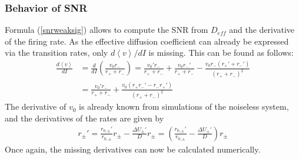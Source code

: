 \documentclass[12pt,a4paper]{article}
\begin{document}
\subsubsection{Behavior of SNR}
Formula (\ref{snrweaksig}) allows to compute the SNR from $D_{eff}$ and the derivative of the firing rate. As the effective diffusion coefficient can already be expressed via the transition rates, only $d\left<v\right>/dI$ is missing. This can be found as follows:
\begin{align*}
\frac{d\left<v\right>}{dI}&=\frac{d}{dI}\left(\frac{v_0r_-}{r_++r_-}\right)=\frac{v_0'r_-}{r_++r_-}+\frac{v_0r_-'}{r_++r_-}-\frac{v_0r_-(r_+'+r_-')}{(r_++r_-)^2}\\
&=\frac{v_0'r_-}{r_++r_-}+\frac{v_0(r_+r_-'-r_-r_+')}{(r_++r_-)^2}
\end{align*}
The derivative of $v_0$ is already known from simulations of the noiseless system, and the derivatives of the rates are given by
\begin{align*}
r_\pm'=\frac{r_{0,\pm}'}{r_{0,\pm}}r_\pm-\frac{\Delta U_\pm'}{D}r_\pm=\left(\frac{r_{0,\pm}'}{r_{0,\pm}}-\frac{\Delta U_\pm'}{D}\right)r_\pm
\end{align*}
Once again, the missing derivatives can now be calculated numerically.
\end{document}
